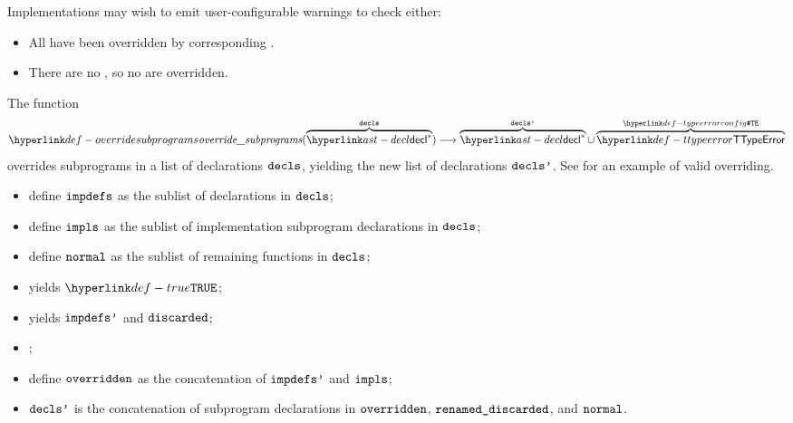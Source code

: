 \noindent
Implementations may wish to emit user-configurable warnings to check either:
\begin{itemize}
  \item All \Proseimpdefsubprograms{} have been overridden by corresponding \Proseimplementationsubprograms{}.
  \item There are no \Proseimplementationsubprograms{}, so no \Proseimpdefsubprograms{} are overridden.
\end{itemize}

\hypertarget{def-overridesubprograms}{}
The function
\[
\overridesubprograms(\overname{\decl^*}{\decls}) \aslto \overname{\decl^*}{\declsp}
\cup \overname{\TTypeError}{\TypeErrorConfig}
\]
overrides subprograms in a list of declarations $\texttt{decls}$, yielding the new list of declarations $\texttt{decls'}$.
\ProseOtherwiseTypeError{}
See  for an example of valid overriding.

\ProseParagraph
\AllApply
\begin{itemize}
  \item define $\vimpdefs$ as the sublist of \Proseimpdefsubprogram{} declarations in $\texttt{decls}$;
  \item define $\vimpls$ as the sublist of implementation subprogram declarations in $\texttt{decls}$;
  \item define $\texttt{normal}$ as the sublist of remaining functions in $\texttt{decls}$;
  \item \Prosecheckimplementationsunique{$\vimpls$} yields $\True$\ProseOrTypeError;
  \item \Proseprocessoverrides{$\vimpdefs$}{$\vimpls$} yields $\texttt{impdefs'}$ and $\vdiscarded$\ProseOrTypeError;
  \item \Proserenamesubprograms{$\vdiscarded$}{$\vrenameddiscarded$};
  \item define $\texttt{overridden}$ as the concatenation of $\texttt{impdefs'}$ and $\vimpls$;
  \item $\texttt{decls'}$ is the concatenation of subprogram declarations in $\texttt{overridden}$, $\vrenameddiscarded$, and $\texttt{normal}$.
\end{itemize}

